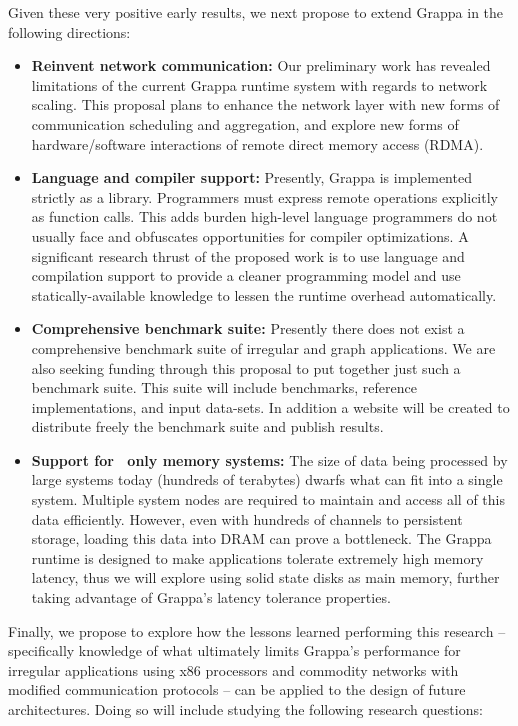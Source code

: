Given these very positive early results,
we next propose to extend Grappa in the following directions:

\begin{itemize}

\item \textbf{Reinvent network communication:} Our preliminary work has
revealed limitations of the current Grappa runtime system with regards to
network scaling. This proposal plans to enhance the network layer with new
forms of communication scheduling and aggregation, and explore new forms of
hardware/software interactions of remote direct memory access (RDMA).

\item \textbf{Language and compiler support:} Presently, Grappa is implemented
strictly as a library.  Programmers must express remote operations explicitly as function calls.
This adds burden high-level language programmers do not usually face and obfuscates opportunities
for compiler optimizations. A significant research thrust of the proposed work is to use
language and compilation support to provide a cleaner programming model and use
statically-available knowledge to lessen the runtime overhead automatically.

\item \textbf{Comprehensive benchmark suite:} Presently there does not exist a
comprehensive benchmark suite of irregular and graph applications. We
are also seeking funding through this proposal to put together just
such a benchmark suite. This suite will include benchmarks, reference
implementations, and input data-sets. In addition a website will be
created to distribute freely the benchmark suite and publish results.

\item \textbf{Support for \ssd\ only memory systems:} The size of data being
processed by large systems today (hundreds of terabytes) dwarfs what can fit
into a single system. Multiple system nodes are required to maintain and
access all of this data efficiently. However, even with hundreds of channels
to persistent storage, loading this data into DRAM can prove a bottleneck. The
Grappa runtime is designed to make applications tolerate extremely high memory
latency, thus we will explore using solid state disks as main memory, 
further taking advantage of Grappa's latency tolerance properties.


\end{itemize}

Finally, we propose to explore how the lessons learned performing this research -- specifically knowledge of what ultimately limits Grappa's performance for irregular applications using x86 processors and commodity networks with modified communication protocols -- can be applied to the design of future architectures.  Doing so will include studying the following research questions:

